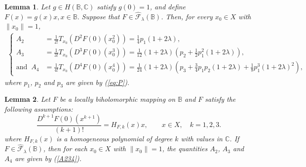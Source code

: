 \documentclass[10pt,a4paper]{amsart}
\newtheorem{lem}{Lemma}
\newcommand{\bea}{\begin{eqnarray}}
\newcommand{\eea}{\end{eqnarray}}
\begin{document}
\begin{lem}\label{L3}  Let $g\in H(\mathbb{B},\mathbb{C})$ satisfy $g(0)=1$, and define $F(x)=g(x)x, x\in\mathbb{B}.$ Suppose that $F\in\widehat{\mathcal{F}}_{\lambda}(\mathbb{B})$. Then, for every
$x_{0}\in X$ with $\|x_{0}\|=1$,
\bea\label{A234}
\begin{cases} A_{2}
&=
\frac{1}{2!}
T_{x_{0}}
\left(
D^{2}F(0)(x_{0}^{2})
\right)
=\frac{1}{4}p_1(1+2\lambda),\\
A_{3}
&=
\frac{1}{3!}
T_{x_{0}}
\left(
D^{3}F(0)(x_{0}^{3})
\right)
=\frac{1}{12}(1+2\lambda)\left(p_2+\frac{1}{2}p_1^2(1+2\lambda)\right),
\\
\text{and}\;\; 
A_{4}
&=
\frac{1}{4!}T_{x_{0}}\left(D^{4}F(0)(x_{0}^{4})\right)=\frac{1}{24}(1+2\lambda)\left(p_3+\frac{3}{4}p_1p_2(1+2\lambda)+\frac{1}{8}p_1^3(1+2\lambda)^2\right),
\end{cases}
\eea
where $p_1$, $p_2$ and $p_3$ are given by (\ref{eq:P}).

\end{lem}

\begin{lem}\label{L4} Let $F$ be a locally biholomorphic mapping on $\mathbb{B}$ and $F$ satisfy the following assumptions:
\begin{equation}\label{cc1}
\frac{D^{k+1}F(0)\left(x^{k+1}\right)}{(k+1)!}
= H_{F,k}(x)x,\qquad x\in X,\quad k=1,2,3.
\end{equation}
where $H_{F,k}(x)$ is a homogeneous polynomial of degree $k$ with values in $\mathbb{C}$. If $F\in \widehat{\mathcal{F}}_{\lambda}(\mathbb{B})$, then for each $x_0\in X$ with $\|x_0\|=1$,  the quantities $A_2$, $A_3$ and $A_4$ are given by  (\ref{A234}).
\end{lem}
\end{document}
